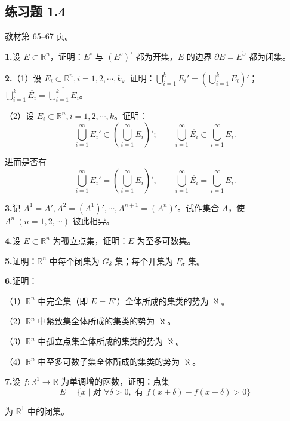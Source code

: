 \documentclass[11pt,a4paper]{article}
\begin{document}
\subsection*{练习题 1.4}
\noindent 教材第 65--67 页。
\par{}\noindent\textbf{1.}\quad 设 $E\subset\mathbb R^n$，证明：$E^\circ$ 与 $(E^c)^\circ$ 都为开集，$E$ 的边界 $\partial E=E^{\mathrm b}$ 都为闭集。
\par{}\noindent\textbf{2.}\quad （1）设 $E_i\subset\mathbb R^n,i=1,2,\cdots,k$。证明：$\bigcup_{i=1}^k E_i'=\left(\bigcup_{i=1}^k E_i\right)'$；$\bigcup_{i=1}^k\overline{E_i}=\overline{\bigcup_{i=1}^k E_i}$。
\par\noindent （2）设 $E_i\subset\mathbb R^n,i=1,2,\cdots,k$。证明：
\[\bigcup_{i=1}^\infty E_i'\subset\left(\bigcup_{i=1}^\infty E_i\right)';\qquad \bigcup_{i=1}^\infty\overline{E_i}\subset\overline{\bigcup_{i=1}^\infty E_i}.\]
\par\noindent 进而是否有
\[\bigcup_{i=1}^\infty E_i'=\left(\bigcup_{i=1}^\infty E_i\right)',\qquad \bigcup_{i=1}^\infty\overline{E_i}=\overline{\bigcup_{i=1}^\infty E_i}.\]
\par{}\noindent\textbf{3.}\quad 记 $A^1=A',A^2=(A^1)',\cdots,A^{n+1}=(A^n)'$。试作集合 $A$，使 $A^n\ (n=1,2,\cdots)$ 彼此相异。
\par{}\noindent\textbf{4.}\quad 设 $E\subset\mathbb R^n$ 为孤立点集，证明：$E$ 为至多可数集。
\par{}\noindent\textbf{5.}\quad 证明：$\mathbb R^n$ 中每个闭集为 $G_\delta$ 集；每个开集为 $F_\sigma$ 集。
\par{}\noindent\textbf{6.}\quad 证明：
\par\noindent （1）$\mathbb R^n$ 中完全集（即 $E=E'$）全体所成的集类的势为 $\aleph$。
\par\noindent （2）$\mathbb R^n$ 中紧致集全体所成的集类的势为 $\aleph$。
\par\noindent （3）$\mathbb R^n$ 中孤立点集全体所成的集类的势为 $\aleph$。
\par\noindent （4）$\mathbb R^n$ 中至多可数子集全体所成的集类的势为 $\aleph$。
\par{}\noindent\textbf{7.}\quad 设 $f:\mathbb R^1\to\mathbb R$ 为单调增的函数，证明：点集
\[E=\{x\mid\text{对 }\forall\delta>0,\text{ 有 } f(x+\delta)-f(x-\delta)>0\}\]
\par\noindent 为 $\mathbb R^1$ 中的闭集。
\end{document}
